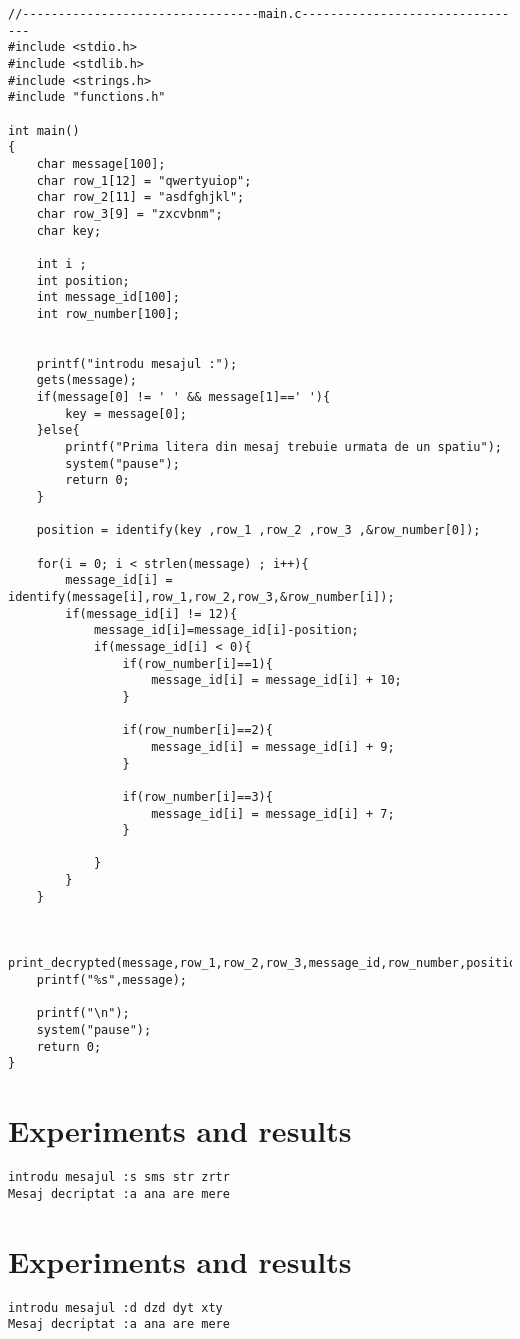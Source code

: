\documentclass[14pt]{article}
\begin{document}
\begin{lstlisting}
//---------------------------------main.c--------------------------------
#include <stdio.h>
#include <stdlib.h>
#include <strings.h>
#include "functions.h"

int main()
{
    char message[100];
    char row_1[12] = "qwertyuiop";
    char row_2[11] = "asdfghjkl";
    char row_3[9] = "zxcvbnm";
    char key;

    int i ;
    int position;
    int message_id[100];
    int row_number[100];


    printf("introdu mesajul :");
    gets(message);
    if(message[0] != ' ' && message[1]==' '){
        key = message[0];
    }else{
        printf("Prima litera din mesaj trebuie urmata de un spatiu");
		system("pause");
        return 0;
    }

    position = identify(key ,row_1 ,row_2 ,row_3 ,&row_number[0]);

    for(i = 0; i < strlen(message) ; i++){
        message_id[i] = identify(message[i],row_1,row_2,row_3,&row_number[i]);
        if(message_id[i] != 12){
            message_id[i]=message_id[i]-position;
            if(message_id[i] < 0){
                if(row_number[i]==1){
                    message_id[i] = message_id[i] + 10;
                }

                if(row_number[i]==2){
                    message_id[i] = message_id[i] + 9;
                }

                if(row_number[i]==3){
                    message_id[i] = message_id[i] + 7;
                }

            }
        }
    }


    print_decrypted(message,row_1,row_2,row_3,message_id,row_number,position);
	printf("%s",message);

	printf("\n");
	system("pause");
    return 0;
}

\end{lstlisting}

\newpage
\section*{Experiments and results}
\begin{lstlisting}
introdu mesajul :s sms str zrtr
Mesaj decriptat :a ana are mere

\end{lstlisting}
\section*{Experiments and results}
\begin{lstlisting}
introdu mesajul :d dzd dyt xty
Mesaj decriptat :a ana are mere

\end{lstlisting}
\end{document}
